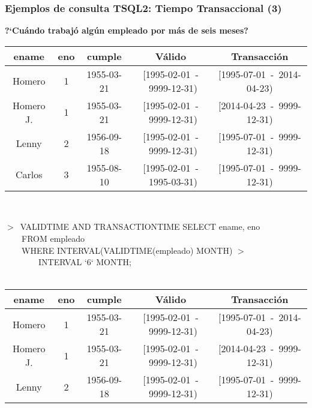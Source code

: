 \documentclass[12pt]{beamer}
\begin{document}
\begin{frame}
\frametitle{Ejemplos de consulta TSQL2: Tiempo Transaccional (3)}
\textbf{?`Cu\'ando trabaj\'o alg\'un empleado por m\'as de seis meses?}\\
\begin{center}
\begin{tiny}
\begin{tabular}{|c|c|c||c|c|}
\hline
ename & eno & cumple & V\'alido & Transacci\'on\\
\hline
Homero & 1 & 1955-03-21 & [1995-02-01\ -\ 9999-12-31) & [1995-07-01\ -\ 2014-04-23)\\
\hline
Homero J. & 1 & 1955-03-21 & [1995-02-01\ -\ 9999-12-31) & [2014-04-23\ -\ 9999-12-31)\\
\hline
Lenny & 2 & 1956-09-18 & [1995-02-01\ -\ 9999-12-31) & [1995-07-01\ -\ 9999-12-31)\\
\hline
Carlos & 3 & 1955-08-10 & [1995-02-01\ -\ 1995-03-31) & [1995-07-01\ -\ 9999-12-31)\\
\hline
\end{tabular}
\end{tiny}
\end{center}
\ \\
\begin{small}$>$\ VALIDTIME AND TRANSACTIONTIME SELECT ename, eno\\
\ \ \ \ FROM empleado\\
\ \ \ \ WHERE INTERVAL(VALIDTIME(empleado) MONTH) $>$\\
\ \ \ \ \ \ \ \ INTERVAL `6` MONTH;\\
\ \\
\end{small}
\begin{center}
\begin{tiny}
\begin{tabular}{|c|c|c||c|c|}
\hline
ename & eno & cumple & V\'alido & Transacci\'on\\
\hline
Homero & 1 & 1955-03-21 & [1995-02-01\ -\ 9999-12-31) & [1995-07-01\ -\ 2014-04-23)\\
\hline
Homero J. & 1 & 1955-03-21 & [1995-02-01\ -\ 9999-12-31) & [2014-04-23\ -\ 9999-12-31)\\
\hline
Lenny & 2 & 1956-09-18 & [1995-02-01\ -\ 9999-12-31) & [1995-07-01\ -\ 9999-12-31)\\
\hline
\end{tabular}
\end{tiny}
\end{center}

\end{frame}
\end{document}
